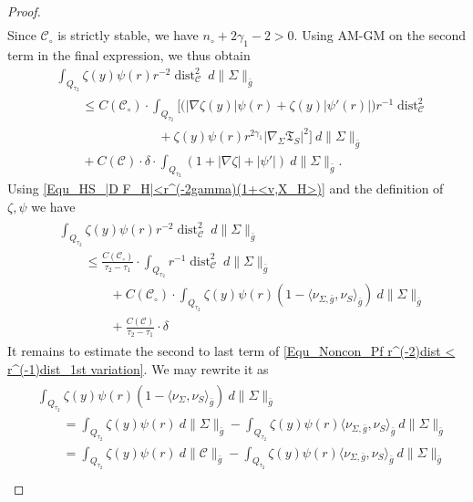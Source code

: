 \documentclass[11pt, letterpaper, reqno]{amsart}
\numberwithin{equation}{section}
\theoremstyle{remark}
\newcommand{\cC}{\mathcal{C}}
\newcommand{\frT}{\mathfrak{T}}
\newcommand{\dist}{\operatorname{dist}}
\begin{document}
\begin{proof}
\begin{align*}
    \end{align*}
    Since $\cC_\circ$ is strictly stable, we have $n_\circ+ 2\gamma_1-2>0$. Using AM-GM on the second term in the final expression, we thus obtain
    \begin{align*}
     & \int_{Q_{\tau_2}} \zeta(y)\psi(r)r^{-2}\dist_\cC^2\ d\|\Sigma\|_{\bar g} \\
     & \qquad \leq C(\cC_\circ) \cdot \int_{Q_{\tau_2}} \Big[ \Big(|\nabla \zeta(y)|\psi(r) + \zeta(y)|\psi'(r)|\Big)r^{-1}\dist_\cC^2 \\
     & \qquad \qquad \qquad \qquad + \zeta(y)\psi(r) r^{2\gamma_1}|\nabla_\Sigma \frT_{{S}}|^2 \Big] \ d\|\Sigma\|_{\bar g} \\
     & \qquad + C(\cC) \cdot \delta \cdot  \int_{Q_{\tau_2}} (1+|\nabla \zeta| + |\psi'|) \ d\|\Sigma\|_{\bar g}.
    \end{align*}
    Using \eqref{Equ_HS_|D F_H|<r^(-2gamma)(1+<v,X_H>)} and the definition of $\zeta,\psi$ we have
    \begin{align}
    \begin{split}
      & \int_{Q_{\tau_2}} \zeta(y)\psi(r)r^{-2}\dist_\cC^2\ d\|\Sigma\|_{\bar g} \\
      & \qquad \leq \frac{C(\cC_\circ)}{\tau_2-\tau_1} \cdot \int_{Q_{\tau_2}} r^{-1}\dist_\cC^2 \ d\|\Sigma\|_{\bar g} \\
      & \qquad \qquad + C(\cC_\circ) \cdot \int_{Q_{\tau_2}}\zeta(y)\psi(r) (1- \langle \nu_{\Sigma,\bar g}, \nu_{{S}} \rangle_{\bar g}) \ d\|\Sigma\|_{\bar g} \\
      & \qquad \qquad + \frac{C(\cC)}{\tau_2-\tau_1}\cdot \delta
    \end{split} \label{Equ_Noncon_Pf r^(-2)dist < r^(-1)dist_1st variation}
    \end{align}
    It remains to estimate the second to last term of \eqref{Equ_Noncon_Pf r^(-2)dist < r^(-1)dist_1st variation}. We may rewrite it as
        \begin{align}\label{eq estimating noncon rewrite}
    \begin{split}
     & \int_{Q_{\tau_2}}\zeta(y)\psi(r) (1- \langle \nu_\Sigma, \nu_{{S}} \rangle_{\bar g}) \ d\|\Sigma\|_{\bar g} \\
     & \qquad = \int_{Q_{\tau_2}}\zeta(y)\psi(r) \ d\|\Sigma\|_{\bar g} - \int_{Q_{\tau_2}}\zeta(y)\psi(r) \langle \nu_{\Sigma,\bar g}, \nu_{{S}} \rangle_{\bar g} \ d\|\Sigma\|_{\bar g} \\
     & \qquad = \int_{Q_{\tau_2}}\zeta(y)\psi(r) \ d\|\cC\|_{\bar g} - \int_{Q_{\tau_2}}\zeta(y)\psi(r) \langle \nu_{\Sigma,\bar g}, \nu_{{S}} \rangle_{\bar g} \ d\|\Sigma\|_{\bar g} \\

\end{split}
\end{align}
\end{proof}
\end{document}
